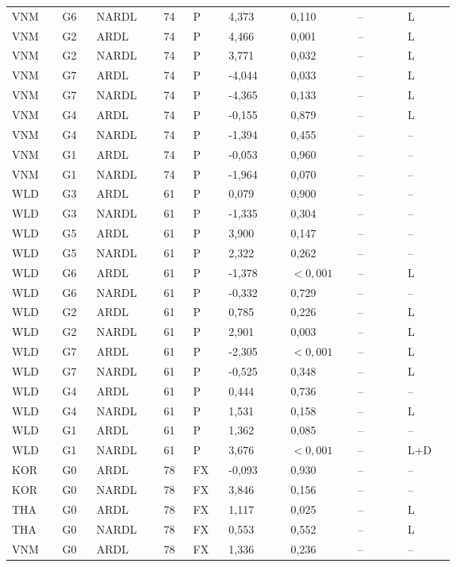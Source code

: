 {\begin{longtable}{p{0.075\linewidth}p{0.05\linewidth}p{0.09\linewidth}p{0.04\linewidth}p{0.05\linewidth}p{0.1\linewidth}p{0.085\linewidth}p{0.085\linewidth}p{0.075\linewidth}}
VNM & G6 & NARDL & 74 & P & 4,373 & 0,110 & -- & L\\
VNM & G2 & ARDL & 74 & P & 4,466 & 0,001 & -- & L\\
VNM & G2 & NARDL & 74 & P & 3,771 & 0,032 & -- & L\\
VNM & G7 & ARDL & 74 & P & -4,044 & 0,033 & -- & L\\
VNM & G7 & NARDL & 74 & P & -4,365 & 0,133 & -- & L\\
VNM & G4 & ARDL & 74 & P & -0,155 & 0,879 & -- & L\\
VNM & G4 & NARDL & 74 & P & -1,394 & 0,455 & -- & --\\
VNM & G1 & ARDL & 74 & P & -0,053 & 0,960 & -- & --\\
VNM & G1 & NARDL & 74 & P & -1,964 & 0,070 & -- & --\\
WLD & G3 & ARDL & 61 & P & 0,079 & 0,900 & -- & --\\
WLD & G3 & NARDL & 61 & P & -1,335 & 0,304 & -- & --\\
WLD & G5 & ARDL & 61 & P & 3,900 & 0,147 & -- & --\\
WLD & G5 & NARDL & 61 & P & 2,322 & 0,262 & -- & --\\
WLD & G6 & ARDL & 61 & P & -1,378 & \(<0{,}001\) & -- & L\\
WLD & G6 & NARDL & 61 & P & -0,332 & 0,729 & -- & --\\
WLD & G2 & ARDL & 61 & P & 0,785 & 0,226 & -- & L\\
WLD & G2 & NARDL & 61 & P & 2,901 & 0,003 & -- & L\\
WLD & G7 & ARDL & 61 & P & -2,305 & \(<0{,}001\) & -- & L\\
WLD & G7 & NARDL & 61 & P & -0,525 & 0,348 & -- & L\\
WLD & G4 & ARDL & 61 & P & 0,444 & 0,736 & -- & --\\
WLD & G4 & NARDL & 61 & P & 1,531 & 0,158 & -- & L\\
WLD & G1 & ARDL & 61 & P & 1,362 & 0,085 & -- & --\\
WLD & G1 & NARDL & 61 & P & 3,676 & \(<0{,}001\) & -- & L+D\\
KOR & G0 & ARDL & 78 & FX & -0,093 & 0,930 & -- & --\\
KOR & G0 & NARDL & 78 & FX & 3,846 & 0,156 & -- & --\\
THA & G0 & ARDL & 78 & FX & 1,117 & 0,025 & -- & L\\
THA & G0 & NARDL & 78 & FX & 0,553 & 0,552 & -- & L\\
VNM & G0 & ARDL & 78 & FX & 1,336 & 0,236 & -- & --\\

\end{longtable}}
